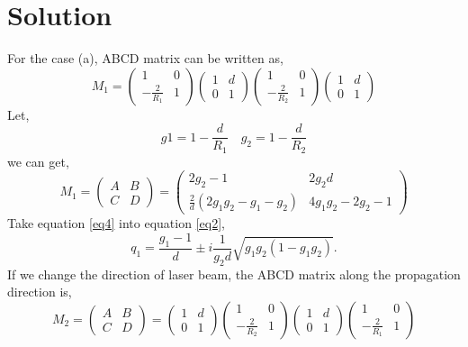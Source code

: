 \documentclass{article}
\begin{document}
\section*{Solution}
For the case (a), ABCD matrix can be written as,
\begin{equation}
	M_1=
	\begin{pmatrix}
		1              & 0\\
		-\frac{2}{R_1} & 1
	\end{pmatrix}
	\begin{pmatrix}
		1 & d\\
		0 & 1
	\end{pmatrix}
	\begin{pmatrix}
		1 & 0\\
		-\frac{2}{R_2} & 1
	\end{pmatrix}
	\begin{pmatrix}
		1 & d\\
		0 & 1
	\end{pmatrix}
\end{equation}
Let,
\begin{equation}
	g1=1-\frac{d}{R_1}\quad g_2=1-\frac{d}{R_2}
\end{equation}
we can get,
\begin{equation}\label{eq4}
	M_1=
	\begin{pmatrix}
		A & B\\
		C & D
	\end{pmatrix}
	=
	\begin{pmatrix}
		2g_2-1 & 2g_2d \\
		\frac{2}{d}(2g_{1}g_{2}-g_{1}-g_{2}) & 4g_{1}g_{2}-2g_2-1
	\end{pmatrix}
\end{equation}
Take equation \ref{eq4} into equation \ref{eq2},
\begin{equation}\label{eq5}
	q_1=\frac{g_1-1}{d}\pm i\frac{1}{g_2d}\sqrt{g_{1}g_{2}(1-g_1g_{2})}.
\end{equation}
If we change the direction of laser beam, the ABCD matrix along the propagation direction is,
\begin{equation}\label{key}
	M_2=
	\begin{pmatrix}
	A & B\\
	C & D
	\end{pmatrix}
	=
	\begin{pmatrix}
	1 & d\\
	0 & 1
	\end{pmatrix}
	\begin{pmatrix}
	1 & 0\\
	-\frac{2}{R_2} & 1
	\end{pmatrix}
	\begin{pmatrix}
	1 & d\\
	0 & 1
	\end{pmatrix}
		\begin{pmatrix}
	1              & 0\\
	-\frac{2}{R_1} & 1
	\end{pmatrix}
\end{equation}
\end{document}
